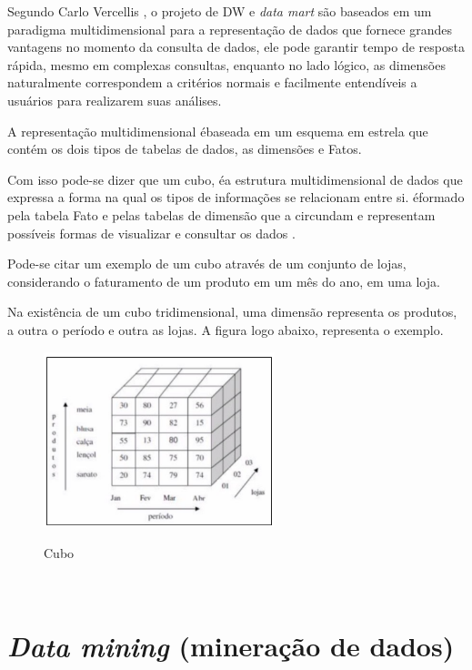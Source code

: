 Segundo Carlo Vercellis \cite{dm-vercellis-2009}, o projeto de DW e \textit{data mart} s\~{a}o baseados em um paradigma multidimensional para a representa\c{c}\~{a}o de dados que fornece grandes vantagens no momento da consulta de dados, ele pode garantir tempo de resposta r\'{a}pida, mesmo em complexas consultas, enquanto no lado l\'{o}gico, as dimens\~{o}es naturalmente correspondem a crit\'{e}rios normais e facilmente entend\'{i}veis a usu\'{a}rios para realizarem suas an\'{a}lises.

A representa\c{c}\~{a}o multidimensional \'{e}baseada em um esquema em estrela que cont\'{e}m os dois tipos de tabelas de dados, as dimens\~{o}es e Fatos.

Com isso pode-se dizer que um cubo, \'{e}a estrutura multidimensional de dados que expressa a forma na qual os tipos de informa\c{c}\~{o}es se relacionam entre si. \'{e}formado pela tabela Fato e pelas tabelas de dimens\~{a}o que a circundam e representam poss\'{i}veis formas de visualizar e consultar os dados \cite{dm-vercellis-2009}.

Pode-se citar um exemplo de um cubo atrav\'{e}s de um conjunto de lojas, considerando o faturamento de um produto em um mês do ano, em uma loja.

Na existência de um cubo tridimensional, uma dimens\~{a}o representa os produtos, a outra o per\'{i}odo e outra as lojas. A figura logo abaixo,  representa o exemplo.

\begin{figure}[H]
	\vspace*{0,2cm}
    \centering
    \caption{Cubo}
    \includegraphics[width=0.6\textwidth]{./04-figuras/figura-12}
    \label{fig:ilustfig12}
\end{figure}
\vspace*{-0,9cm}
{\raggedright {}} \\

\section{\textit{Data mining} (minera\c{c}\~{a}o de dados)}

